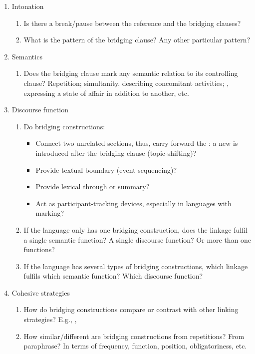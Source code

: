 \documentclass[output=paper]{LSP/langsci}
\begin{document}
\begin{enumerate}
\item  Intonation
\begin{enumerate}
\item  Is there a break/pause between the reference and the bridging clauses? 
\item  What is the  pattern of the bridging clause? Any other particular  pattern?
\end{enumerate}

\item   Semantics
\begin{enumerate}
\item Does the bridging clause mark any semantic relation to its controlling clause? Repetition; simultanity, describing concomitant activities; , expressing a state of affair in addition to another, etc.
\end{enumerate}

\item   Discourse function 
\begin{enumerate}
\item  Do bridging constructions: 
\begin{itemize}
\item Connect two unrelated sections, thus, carry forward the : a new  is introduced after the bridging clause (topic-shifting)?
\item Provide textual boundary (event sequencing)?
\item Provide lexical  through  or summary?
\item Act as participant-tracking devices, especially in languages with  marking? 
\end{itemize}
\item  If the language only has one bridging construction, does the linkage fulfil a single semantic function? A single discourse function? Or more than one functions?
\item  If the language has several types of bridging constructions, which linkage fulfils which semantic function? Which discourse function?
\end{enumerate}

\item   Cohesive strategies
\begin{enumerate}
\item How do bridging constructions compare or contrast with other linking strategies? 
E.g., ,  
\item  How similar/different are bridging constructions from repetitions? From paraphrase?
In terms of frequency, function, position, obligatoriness, etc.
\end{enumerate}


\end{enumerate}
\end{document}
